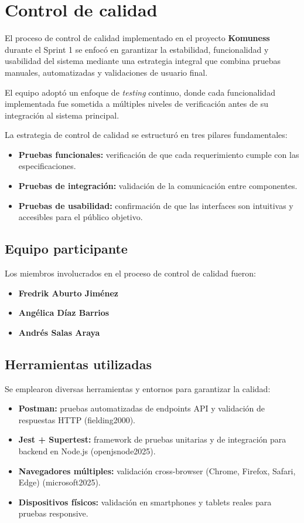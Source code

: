 \chapter{Control de calidad}

El proceso de control de calidad implementado en el proyecto \textbf{Komuness} durante el Sprint 1 se enfocó en garantizar la estabilidad, funcionalidad y usabilidad del sistema mediante una estrategia integral que combina pruebas manuales, automatizadas y validaciones de usuario final. 

El equipo adoptó un enfoque de \textit{testing} continuo, donde cada funcionalidad implementada fue sometida a múltiples niveles de verificación antes de su integración al sistema principal.

La estrategia de control de calidad se estructuró en tres pilares fundamentales:
\begin{itemize}
    \item \textbf{Pruebas funcionales:} verificación de que cada requerimiento cumple con las especificaciones.
    \item \textbf{Pruebas de integración:} validación de la comunicación entre componentes.
    \item \textbf{Pruebas de usabilidad:} confirmación de que las interfaces son intuitivas y accesibles para el público objetivo.
\end{itemize}

\section{Equipo participante}
Los miembros involucrados en el proceso de control de calidad fueron:
\begin{itemize}
    \item \textbf{Fredrik Aburto Jiménez} 
    \item \textbf{Angélica Díaz Barrios} 
    \item \textbf{Andrés Salas Araya} 
\end{itemize}

\section{Herramientas utilizadas}
Se emplearon diversas herramientas y entornos para garantizar la calidad:
\begin{itemize}
    \item \textbf{Postman:} pruebas automatizadas de endpoints API y validación de respuestas HTTP (fielding2000).
   \item \textbf{Jest + Supertest:} framework de pruebas unitarias y de integración para backend en Node.js (openjsnode2025).
  \item \textbf{Navegadores múltiples:} validación cross-browser (Chrome, Firefox, Safari, Edge) (microsoft2025).
  \item \textbf{Dispositivos físicos:} validación en smartphones y tablets reales para pruebas responsive.

\end{itemize}

